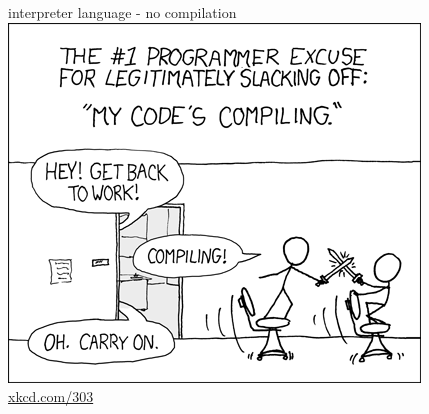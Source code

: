 \documentclass[xcolor=table,           xcolor=dvipsnames]{beamer}\usepackage[]{graphicx}\usepackage[]{color}
\begin{document}

\begin{frame}{interpreter language - no compilation}
\pause
\centering
\includegraphics[height=0.65\textheight]{externalfig/compiling.png}\\
\href{https://xkcd.com/303/}{xkcd.com/303}
\end{frame}



\end{document}
